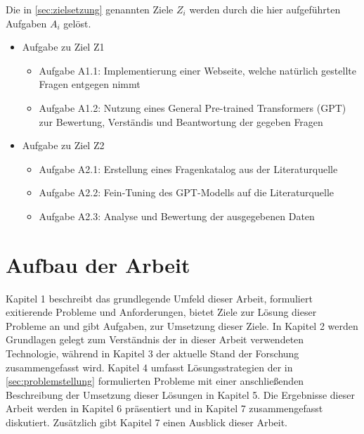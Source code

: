 Die in \ref{sec:zielsetzung} genannten Ziele $Z_i$ werden durch die hier aufgeführten Aufgaben $A_i$ gelöst.

\begin{itemize}
  \item Aufgabe zu Ziel Z1
  \begin{itemize}
    \item Aufgabe A1.1: Implementierung einer Webseite, welche natürlich gestellte Fragen entgegen nimmt
    \item Aufgabe A1.2: Nutzung eines General Pre-trained Transformers (GPT) zur Bewertung, Verständis und Beantwortung der gegeben Fragen
  \end{itemize}
  \item Aufgabe zu Ziel Z2
  \begin{itemize}
    \item Aufgabe A2.1: Erstellung eines Fragenkatalog aus der Literaturquelle
    \item Aufgabe A2.2: Fein-Tuning des GPT-Modells auf die Literaturquelle
    \item Aufgabe A2.3: Analyse und Bewertung der ausgegebenen Daten
  \end{itemize}
\end{itemize}

\section{Aufbau der Arbeit}
Kapitel 1 beschreibt das grundlegende Umfeld dieser Arbeit, formuliert exitierende Probleme und Anforderungen, bietet Ziele zur Lösung dieser Probleme an und gibt Aufgaben, zur Umsetzung dieser Ziele. 
In Kapitel 2 werden Grundlagen gelegt zum Verständnis der in dieser Arbeit verwendeten Technologie, während in Kapitel 3 der aktuelle Stand der Forschung zusammengefasst wird. 
Kapitel 4 umfasst Lösungsstrategien der in \ref{sec:problemstellung} formulierten Probleme mit einer anschließenden Beschreibung der Umsetzung dieser Lösungen in Kapitel 5. 
Die Ergebnisse dieser Arbeit werden in Kapitel 6 präsentiert und in Kapitel 7 zusammengefasst diskutiert. Zusätzlich gibt Kapitel 7 einen Ausblick dieser Arbeit.